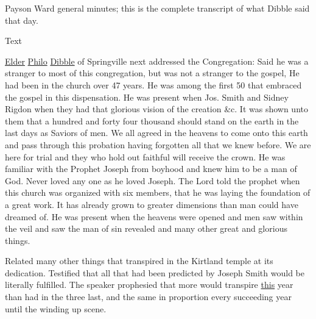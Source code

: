					Payson Ward general minutes; this is the complete transcript of what Dibble said that day.
				
				\begin{description}
					\item[Text]
				\end{description}
				
					\uline{Elder} \uline{Philo} \uline{Dibble} of Springville next addressed the Congregation: Said he was a stranger to most of this congregation, but was not a stranger to the gospel, He had been in the church over 47 years. He was among the first 50 that embraced the gospel in this dispensation. He was present when Jos. Smith and Sidney Rigdon when they had that glorious vision of the creation \&c. It was shown unto them that a hundred and forty four thousand should stand on the earth in the last days as Saviors of men. We all agreed in the heavens to come onto this earth and pass through this probation having forgotten all that we knew before. We are here for trial and they who hold out faithful will receive the crown. He was familiar with the Prophet Joseph from boyhood and knew him to be a man of God. Never loved any one as he loved Joseph. The Lord told the prophet when this church was organized with six members, that he was laying the foundation of a great work. It has already grown to greater dimensions than man could have dreamed of. He was present when the heavens were opened and men saw within the veil and saw the man of sin revealed and many other great and glorious things.
					
					Related many other things that transpired in the Kirtland temple at its dedication. Testified that all that had been predicted by Joseph Smith would be literally fulfilled. The speaker prophesied that more would transpire \uline{this} year than had in the three last, and the same in proportion every succeeding year until the winding up scene.
					
